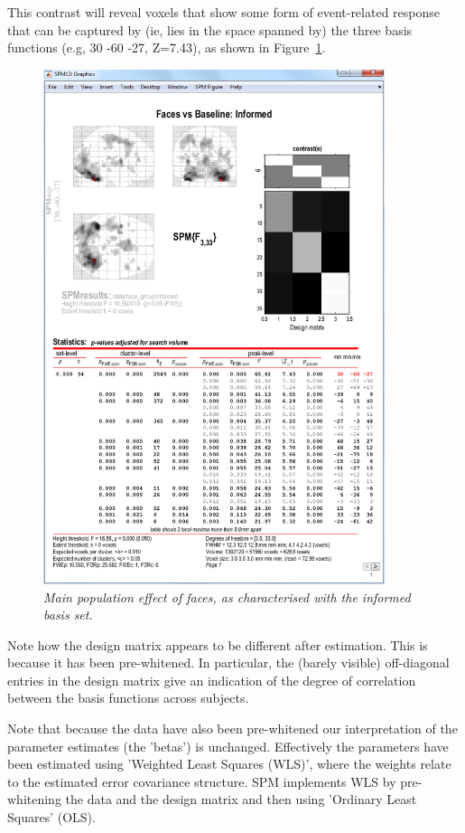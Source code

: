This contrast will reveal voxels that show some form of event-related response that can be captured by (ie, lies in the space spanned by) the three basis functions (e.g, 30 -60 -27, Z=7.43), as shown in Figure~\ref{informed_results}. 
\begin{figure}
\begin{center}
\includegraphics[width=100mm]{informed_results}
\caption{\em Main population effect of faces, as characterised with the informed basis set. \label{informed_results}}
\end{center}
\end{figure}

Note how the design matrix appears to be different after estimation. This is because it has been pre-whitened. In particular, the (barely visible) off-diagonal entries in the design matrix give an indication of the degree of correlation between the basis functions across subjects.

Note that because the data have also been pre-whitened our interpretation of the parameter estimates (the 'betas') is unchanged. Effectively the parameters have been estimated using 'Weighted Least Squares (WLS)', where the weights relate to the estimated error covariance structure. SPM implements WLS by pre-whitening the data and the design matrix and then using 'Ordinary Least Squares' (OLS).

